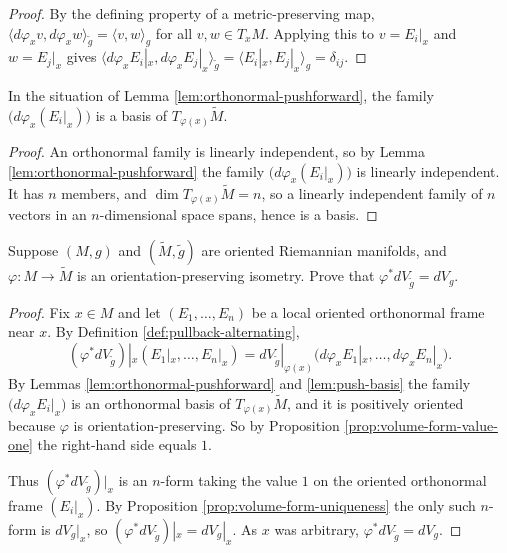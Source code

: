 \begin{proof}
\leanok
{}
By the defining property of a metric-preserving map,
$\langle d\varphi_x v, d\varphi_x w \rangle_{\tilde{g}} = \langle v, w \rangle_g$ for all
$v,w \in T_x M$. Applying this to $v = E_i|_x$ and $w = E_j|_x$ gives
$\langle d\varphi_x E_i|_x, d\varphi_x E_j|_x \rangle_{\tilde{g}} = \langle E_i|_x, E_j|_x\rangle_g
= \delta_{ij}$.
\end{proof}

\begin{lemma}
\label{lem:push-basis}
\leanok
{}
In the situation of Lemma \ref{lem:orthonormal-pushforward}, the family
$\bigl(d\varphi_x(E_i|_x)\bigr)$ is a basis of $T_{\varphi(x)}\tilde{M}$.
\end{lemma}

\begin{proof}
\leanok
{}
An orthonormal family is linearly independent, so by Lemma \ref{lem:orthonormal-pushforward} the
family $\bigl(d\varphi_x(E_i|_x)\bigr)$ is linearly independent. It has $n$ members, and
$\dim T_{\varphi(x)}\tilde{M} = n$, so a linearly independent family of $n$ vectors in an
$n$-dimensional space spans, hence is a basis.
\end{proof}

\begin{exercise}\label{exer:isometry-preserves-volume-form}
\leanok
{}
Suppose $(M,g)$ and $(\tilde{M},\tilde{g})$ are oriented Riemannian manifolds, and $\varphi: M \to \tilde{M}$ is an orientation-preserving isometry. Prove that $\varphi^* dV_{\tilde{g}} = dV_g$.
\end{exercise}

\begin{proof}
\leanok
{}
Fix $x \in M$ and let $(E_1,\ldots,E_n)$ be a local oriented orthonormal frame near $x$. By
Definition \ref{def:pullback-alternating},
\[
(\varphi^* dV_{\tilde{g}})|_x(E_1|_x,\ldots,E_n|_x)
  = dV_{\tilde{g}}|_{\varphi(x)}\bigl(d\varphi_x E_1|_x, \ldots, d\varphi_x E_n|_x\bigr).
\]
By Lemmas \ref{lem:orthonormal-pushforward} and \ref{lem:push-basis} the family
$\bigl(d\varphi_x E_i|_x\bigr)$ is an orthonormal basis of $T_{\varphi(x)}\tilde{M}$, and it is
positively oriented because $\varphi$ is orientation-preserving. So by Proposition
\ref{prop:volume-form-value-one} the right-hand side equals $1$.

Thus $(\varphi^* dV_{\tilde{g}})|_x$ is an $n$-form taking the value $1$ on the oriented
orthonormal frame $(E_i|_x)$. By Proposition \ref{prop:volume-form-uniqueness} the only such
$n$-form is $dV_g|_x$, so $(\varphi^* dV_{\tilde{g}})|_x = dV_g|_x$. As $x$ was arbitrary,
$\varphi^* dV_{\tilde{g}} = dV_g$.
\end{proof}

